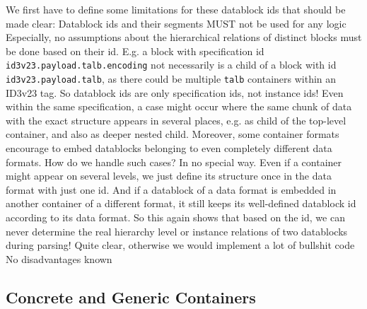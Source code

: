 We first have to define some limitations for these datablock ids that should be made clear:
{%
Datablock ids and their segments MUST not be used for any logic 
}
{%
Especially, no assumptions about the hierarchical relations of distinct blocks must be done based on their id. E.g. a block with specification id \texttt{id3v23.payload.talb.encoding} not necessarily is a child of a block with id \texttt{id3v23.payload.talb}, as there could be multiple \texttt{talb} containers within an ID3v23 tag. So datablock ids are only specification ids, not instance ids! Even within the same specification, a case might occur where the same chunk of data with the exact structure appears in several places, e.g. as child of the top-level container, and also as deeper nested child. Moreover, some container formats encourage to embed datablocks belonging to even completely different data formats. How do we handle such cases? In no special way. Even if a container might appear on several levels, we just define its structure once in the data format with just one id. And if a datablock of a data format is embedded in another container of a different format, it still keeps its well-defined datablock id according to its data format. So this again shows that based on the id, we can never determine the real hierarchy level or instance relations of two datablocks during parsing! 
}
{%
Quite clear, otherwise we would implement a lot of bullshit code
}
{%
No disadvantages known
}

\subsection{Concrete and Generic Containers}%
\label{sec:ConcreteandGenericContainers}%

